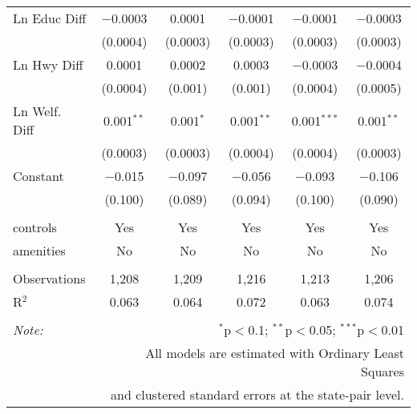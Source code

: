 \begin{table}[!htbp]
\begin{tabular}{@{\extracolsep{5pt}}lccccc}
  Ln Educ Diff & $-$0.0003 & 0.0001 & $-$0.0001 & $-$0.0001 & $-$0.0003 \\ 
  & (0.0004) & (0.0003) & (0.0003) & (0.0003) & (0.0003) \\ 
  Ln Hwy Diff & 0.0001 & 0.0002 & 0.0003 & $-$0.0003 & $-$0.0004 \\ 
  & (0.0004) & (0.001) & (0.001) & (0.0004) & (0.0005) \\ 
  Ln Welf. Diff & 0.001$^{**}$ & 0.001$^{*}$ & 0.001$^{**}$ & 0.001$^{***}$ & 0.001$^{**}$ \\ 
  & (0.0003) & (0.0003) & (0.0004) & (0.0004) & (0.0003) \\ 
  Constant & $-$0.015 & $-$0.097 & $-$0.056 & $-$0.093 & $-$0.106 \\ 
  & (0.100) & (0.089) & (0.094) & (0.100) & (0.090) \\ 
 \hline \\[-1.8ex] 
controls & Yes & Yes & Yes & Yes & Yes \\ 
amenities & No & No & No & No & No \\ 
\hline \\[-1.8ex] 
Observations & 1,208 & 1,209 & 1,216 & 1,213 & 1,206 \\ 
R$^{2}$ & 0.063 & 0.064 & 0.072 & 0.063 & 0.074 \\ 
\hline 
\hline \\[-1.8ex] 
\textit{Note:}  & \multicolumn{5}{r}{$^{*}$p$<$0.1; $^{**}$p$<$0.05; $^{***}$p$<$0.01} \\ 
 & \multicolumn{5}{r}{All models are estimated with Ordinary Least Squares} \\ 
 & \multicolumn{5}{r}{and clustered standard errors at the state-pair level.} \\ 
\end{tabular} 
\end{table} 
